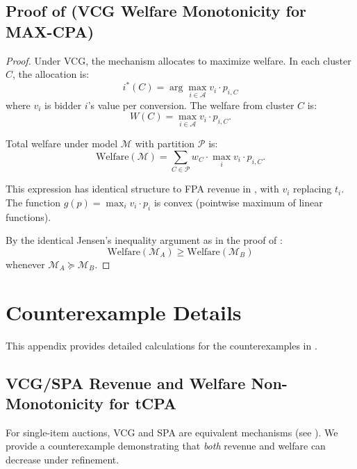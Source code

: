 \documentclass{article}
\theoremstyle{plain}
\theoremstyle{definition}
\theoremstyle{remark}
\newcommand{\cA}{\mathcal{A}}
\newcommand{\cM}{\mathcal{M}}
\newcommand{\cP}{\mathcal{P}}
\begin{document}
\subsection{Proof of  (VCG Welfare Monotonicity for MAX-CPA)}

\begin{proof}
Under VCG, the mechanism allocates to maximize welfare. In each cluster $C$, the allocation is:
\begin{equation}
i^*(C) = \arg\max_{i \in \cA} v_i \cdot p_{i,C}
\end{equation}
where $v_i$ is bidder $i$'s value per conversion. The welfare from cluster $C$ is:
\begin{equation}
W(C) = \max_{i \in \cA} v_i \cdot p_{i,C}.
\end{equation}

Total welfare under model $\cM$ with partition $\cP$ is:
\begin{equation}
\text{Welfare}(\cM) = \sum_{C \in \cP} w_C \cdot \max_{i} v_i \cdot p_{i,C}.
\end{equation}

This expression has identical structure to FPA revenue in , with $v_i$ replacing $t_i$. The function $g(p) = \max_i v_i \cdot p_i$ is convex (pointwise maximum of linear functions).

By the identical Jensen's inequality argument as in the proof of :
\begin{equation}
\text{Welfare}(\cM_A) \geq \text{Welfare}(\cM_B)
\end{equation}
whenever $\cM_A \succeq \cM_B$.
\end{proof}

\section{Counterexample Details}
\label{app:counterexamples}

This appendix provides detailed calculations for the counterexamples in .

\subsection{VCG/SPA Revenue and Welfare Non-Monotonicity for tCPA}
\label{app:counter-vcg-tcpa}

For single-item auctions, VCG and SPA are equivalent mechanisms (see ). We provide a counterexample demonstrating that \emph{both} revenue and welfare can decrease under refinement.
\end{document}
